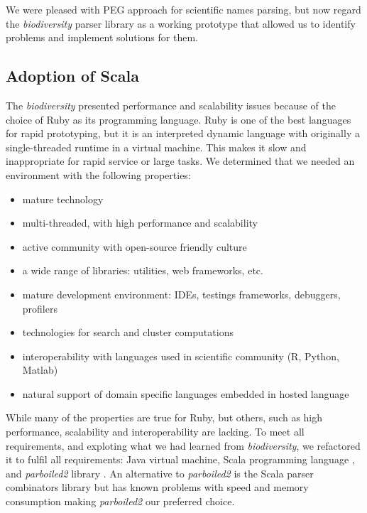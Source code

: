 \documentclass{bmcart}
\begin{document}
We were pleased with PEG approach for scientific
names parsing, but now regard the \textit{biodiversity} parser library as a working prototype that allowed us to identify  problems and implement
solutions for them.

\subsection*{Adoption of Scala}

The \textit{biodiversity} presented performance and scalability issues because
of the choice of Ruby as its programming language. Ruby is one of the best
languages for rapid prototyping, but it is an interpreted dynamic language with
originally a single-threaded runtime in a virtual machine. This makes it slow
and inappropriate for rapid service or large tasks. We determined that we
needed an environment with the following properties:

\begin{itemize}
    \item mature technology
    \item multi-threaded, with high performance and scalability
    \item active community with open-source friendly culture
    \item a wide range of libraries: utilities, web frameworks, etc.
    \item mature development environment: IDEs, testings frameworks,
    debuggers, profilers
    \item technologies for search and cluster computations
    \item interoperability with languages used in scientific community (R,
    Python, Matlab)
    \item natural support of domain specific languages embedded in hosted
    language
\end{itemize}

While many of the properties are true for Ruby, but others, such as high
performance, scalability and interoperability are lacking. To meet all
requirements, and exploting what we had learned from \textit{biodiversity}, we refactored
it to fulfil all requirements: Java virtual machine, Scala programming language
\cite{odersky2004overview}, and \textit{parboiled2} library \cite{parboiled2}.
An alternative to \textit{parboiled2} is the Scala parser combinators library
\cite{moors2008parser} but has known problems with speed and memory consumption making
\textit{parboiled2} our preferred choice.
\end{document}
